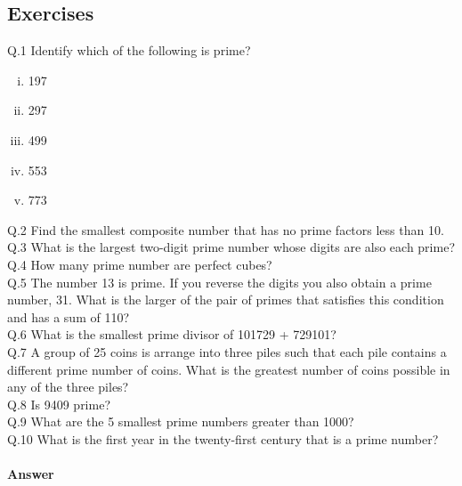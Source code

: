 \documentclass[a4paper,10pt]{article}
\begin{document}
\subsection{Exercises}
Q.1 {Identify which of the following is prime?}
\begin{multicols}{3}
\begin{enumerate}[(i)]
\item 197
\item 297
\item 499
\item 553
\item 773
\end{enumerate}
\end{multicols}
\noindent Q.2 {Find the smallest composite number that has no prime
factors less than 10.}\\
Q.3 {What is the largest two-digit prime number whose digits
are also each prime?}\\
Q.4 {How many prime number are perfect cubes?}\\
Q.5 {The number 13 is prime. If you reverse the digits you
also obtain a prime number, 31.
What is the larger of the pair of primes that satisfies this condition
and has a sum of 110?}\\
Q.6 {What is the smallest prime divisor of 101729 + 729101?}\\
Q.7 {A group of 25 coins is arrange into three piles such that
each pile contains a different
prime number of coins. What is the greatest number of coins possible in
any of the three
piles?}\\
Q.8 {Is 9409 prime?}\\
Q.9 {What are the 5 smallest prime numbers greater than 1000?}\\
Q.10 {What is the first year in the twenty-first century that
is a prime number?}\\\\
\Large{\textbf{Answer}}\\\\
\end{document}
